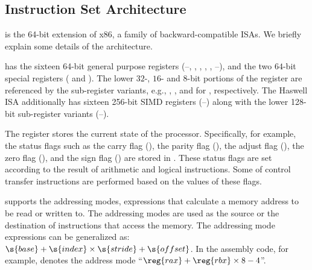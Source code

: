 \subsection{\ISA Instruction Set Architecture}

\ISA is the 64-bit extension of x86, a family of backward-compatible ISAs.
%
We briefly explain some details of the architecture.

\ISA has the sixteen 64-bit general purpose registers (--, , , , , --), and the two $64$-bit special registers ( and ).
The lower $32$-, $16$- and $8$-bit portions of the register are referenced by the sub-register variants, e.g., , , and  for , respectively.
The Haswell \ISA ISA additionally has sixteen 256-bit SIMD registers (--) along with the lower 128-bit sub-register variants (--).

The  register stores the current state of the processor.
Specifically, for example, the status flags such as the carry flag (), the parity flag (), the adjust flag (), the zero flag (), and the sign flag () are stored in .
These status flags are set according to the result of arithmetic and logical instructions.
Some of control transfer instructions are performed based on the values of these flags.

\ISA supports the addressing modes, expressions that calculate a memory address to be read or written to. The addressing modes are used as the source or the destination of instructions that access the memory.
The addressing mode expressions can be generalized as:
$\s{base} + \s{index} \times \s{stride} + \s{offset}$.
In the assembly code, for example,  denotes the address mode ``$\reg{rax} + \reg{rbx} \times 8 - 4$''.


